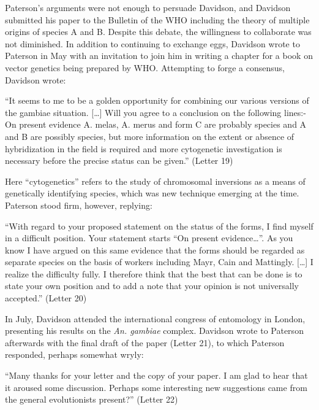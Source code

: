 \documentclass[a4paper,11pt,abstracton,hidelinks]{scrartcl}
\begin{document}
Paterson's arguments were not enough to persuade Davidson, and Davidson submitted his paper to the Bulletin of the WHO including the theory of multiple origins of species A and B.
%
Despite this debate, the willingness to collaborate was not diminished.
%
In addition to continuing to exchange eggs, Davidson wrote to Paterson in May with an invitation to join him in writing a chapter for a book on vector genetics being prepared by WHO.
%
Attempting to forge a consensus, Davidson wrote:


\begin{displayquote}
``It seems to me to be a golden opportunity for combining our various versions of the gambiae situation. [\ldots] Will you agree to a conclusion on the following lines:- On present evidence A. melas, A. merus and form C are probably species and A and B are possibly species, but more information on the extent or absence of hybridization in the field is required and more cytogenetic investigation is necessary before the precise status can be given.'' (Letter 19)
\end{displayquote}


Here ``cytogenetics'' refers to the study of chromosomal inversions as a means of genetically identifying species, which was new technique emerging at the time.
%
Paterson stood firm, however, replying:


\begin{displayquote}
``With regard to your proposed statement on the status of the forms, I find myself in a difficult position. Your statement starts ``On present evidence\ldots''. As you know I have argued on this same evidence that the forms should be regarded as separate species on the basis of workers including Mayr, Cain and Mattingly. [\ldots] I realize the difficulty fully. I therefore think that the best that can be done is to state your own position and to add a note that your opinion is not universally accepted.'' (Letter 20)
\end{displayquote}


In July, Davidson attended the international congress of entomology in London, presenting his results on the \textit{An. gambiae} complex.
%
Davidson wrote to Paterson afterwards with the final draft of the paper (Letter 21), to which Paterson responded, perhaps somewhat wryly:


\begin{displayquote}
``Many thanks for your letter and the copy of your paper. I am glad to hear that it aroused some discussion. Perhaps some interesting new suggestions came from the general evolutionists present?'' (Letter 22)
\end{displayquote}
\end{document}

